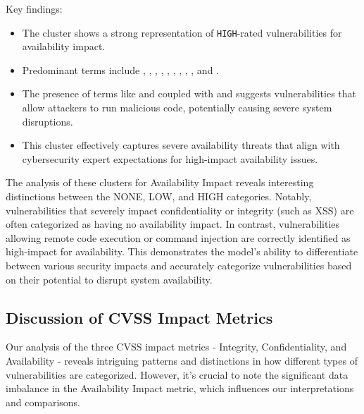 \documentclass[12pt]{article}
\begin{document}
Key findings:

\begin{itemize}

	\item The cluster shows a strong representation of \texttt{HIGH}-rated vulnerabilities for
	      availability impact.

	\item Predominant terms include , , ,
	      , ,
	      , , , , and .

	\item The presence of terms like  and  coupled with  and 
	      suggests vulnerabilities that allow attackers to run malicious code, potentially causing
	      severe system disruptions.

	\item This cluster effectively captures severe availability threats that align with
	      cybersecurity expert expectations for high-impact availability issues.

\end{itemize}

The analysis of these clusters for Availability Impact reveals interesting distinctions between the
NONE, LOW, and HIGH categories. Notably, vulnerabilities that severely impact confidentiality or
integrity (such as XSS) are often categorized as having no availability impact. In contrast,
vulnerabilities allowing remote code execution or command injection are correctly identified as
high-impact for availability. This demonstrates the model's ability to differentiate between various
security impacts and accurately categorize vulnerabilities based on their potential to disrupt
system availability.


\subsection{Discussion of CVSS Impact Metrics}

Our analysis of the three CVSS impact metrics - Integrity, Confidentiality, and Availability -
reveals intriguing patterns and distinctions in how different types of vulnerabilities are
categorized. However, it's crucial to note the significant data imbalance in the Availability Impact
metric, which influences our interpretations and comparisons.
\end{document}
